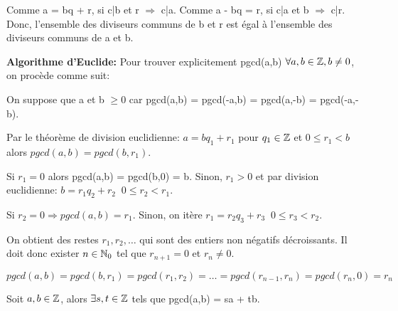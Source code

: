 \begin{demo}
Comme a = bq + r, si c|b et r $\Rightarrow$ c|a.
Comme a - bq = r, si c|a et b $\Rightarrow$ c|r.
Donc, l'ensemble des diviseurs communs de b et r est égal à l'ensemble des diviseurs communs de a et b.
\end{demo}

\hspace{-0.55cm}\textbf{Algorithme d'Euclide:} Pour trouver explicitement pgcd(a,b) $\forall a,b \in \mathbb{Z}, b\neq 0$, on procède comme suit:

On suppose que a et b $\geq 0$ car pgcd(a,b) = pgcd(-a,b) = pgcd(a,-b) = pgcd(-a,-b).

Par le théorème de division euclidienne: $a = bq_1 + r_1$ pour $q_1 \in \mathbb{Z}$ et $0 \leq r_1 < b$ alors $pgcd(a,b) = pgcd(b,r_1)$. 

Si $r_1 = 0$ alors pgcd(a,b) = pgcd(b,0) = b. Sinon, $r_1 > 0$ et par division euclidienne: $b = r_1 q_2 + r_2 \;\; 0 \leq r_2 < r_1$.

Si $r_2 = 0 \Rightarrow pgcd(a,b) = r_1$. Sinon, on itère $r_1 = r_2 q_3 + r_3 \;\; 0 \leq r_3 < r_2$.

On obtient des restes $r_1,r_2,\ldots$ qui sont des entiers non négatifs décroissants. Il doit donc exister $n \in \mathbb{N}_0$ tel que $r_{n+1} = 0$ et $r_n \neq 0$.

$pgcd(a,b) = pgcd(b,r_1) = pgcd(r_1,r_2) = \ldots = pgcd(r_{n-1},r_n) = pgcd(r_n,0) = r_n$

\newpage

\begin{prop}
Soit $a,b \in \mathbb{Z}$, alors $\exists s,t \in \mathbb{Z}$ tels que pgcd(a,b) = sa + tb.
\end{prop}

